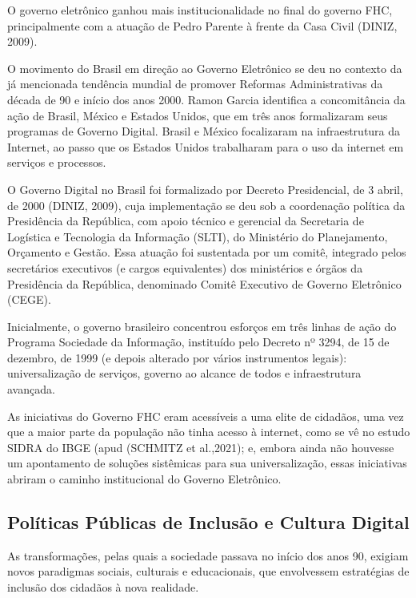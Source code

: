 O governo eletrônico ganhou mais institucionalidade no final do governo FHC, principalmente com a atuação de Pedro Parente à frente da Casa Civil (DINIZ, 2009).

O movimento do Brasil em direção ao Governo Eletrônico se deu no contexto da já mencionada tendência mundial de promover Reformas Administrativas da década de 90 e início dos anos 2000. Ramon Garcia identifica a concomitância da ação de Brasil, México e Estados Unidos, que em três anos formalizaram seus programas de Governo Digital. Brasil e México focalizaram na infraestrutura da Internet, ao passo que os Estados Unidos trabalharam para o uso da internet em serviços e processos.

O Governo Digital no Brasil foi formalizado por Decreto Presidencial, de 3 abril, de 2000  (DINIZ, 2009), cuja implementação se deu sob a coordenação política da Presidência da República, com apoio técnico e gerencial da Secretaria de Logística e Tecnologia da Informação (SLTI), do Ministério do Planejamento, Orçamento e Gestão. Essa atuação foi sustentada por um comitê, integrado pelos secretários executivos (e cargos equivalentes) dos ministérios e órgãos da Presidência da República, denominado Comitê Executivo de Governo Eletrônico (CEGE).

Inicialmente, o governo brasileiro concentrou esforços em três linhas de ação do Programa Sociedade da Informação, instituído pelo Decreto nº 3294, de 15 de dezembro, de 1999 (e depois alterado por vários instrumentos legais): universalização de serviços, governo ao alcance de todos e infraestrutura avançada.

As iniciativas do Governo FHC eram  acessíveis a uma elite de cidadãos, uma vez que a maior parte da população não tinha acesso à internet, como se vê no estudo SIDRA do IBGE (apud (SCHMITZ et al.,2021); e, embora ainda não houvesse um apontamento de soluções sistêmicas para sua universalização, essas iniciativas abriram o caminho institucional do Governo Eletrônico.

\subsection[Políticas Públicas de Inclusão e Cultura Digital]{Políticas Públicas de Inclusão e Cultura Digital}\label{Políticas Públicas de Inclusão e Cultura Digital}
As transformações, pelas quais a sociedade passava no início dos anos 90, exigiam novos paradigmas sociais, culturais e educacionais, que envolvessem estratégias de inclusão dos  cidadãos à nova realidade.


